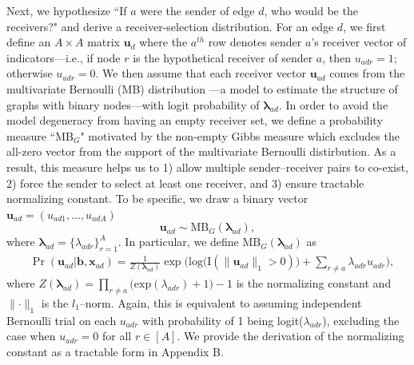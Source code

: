 \documentclass[ba]{imsart}
\numberwithin{equation}{section}
\theoremstyle{plain}
\begin{document}
Next, we hypothesize ``If $a$ were the sender of edge $d$, who would be the receivers?" and derive a receiver-selection distribution. For an edge $d$, we first define an $A\times A$ matrix $\boldsymbol{u}_d$ where the $a^{th}$ row denotes sender $a$'s receiver vector of indicators---i.e., if node $r$ is the hypothetical receiver of sender $a$, then $u_{adr}=1$; otherwise $u_{adr}=0$. We then assume that each receiver vector $\boldsymbol{u}_{ad}$ comes from the multivariate Bernoulli (MB) distribution \citep{dai2013multivariate}---a model to estimate the structure of graphs with binary nodes---with logit probability of $\boldsymbol{\lambda}_{ad}$. In order to avoid the model degeneracy from having an empty receiver set, we define a probability measure ``MB$_{G}$" motivated by the non-empty Gibbs measure \citep{fellows2017removing} which excludes the all-zero vector from the support of the multivariate Bernoulli distirbution. As a result, this measure helps us to 1) allow multiple sender--receiver pairs to co-exist, 2) force the sender to select at least one receiver, and 3) ensure tractable normalizing constant. To be specific, we draw a binary vector $\boldsymbol{u}_{ad}= (u_{ad1},
\ldots, u_{adA})$ 
\begin{equation} \boldsymbol{u}_{ad}  \sim
\mbox{MB}_{G}(\boldsymbol{\lambda}_{ad}),
\end{equation}
where $\boldsymbol{\lambda}_{ad}= \{\lambda_{adr}\}_{r=1}^A$. In particular, we define $\mbox{MB}_{G}(\boldsymbol{\lambda}_{ad})$ as
\begin{equation}
\begin{aligned}
&\Pr(\boldsymbol{u}_{ad}|\boldsymbol{b}, \boldsymbol{x}_{ad}) = \frac{1}{Z(\boldsymbol{\lambda}_{ad})}\exp\Big(\mbox{log}\big(\text{I}( \lVert \boldsymbol{u}_{ad}\rVert_1 > 0 )\big) + \sum_{r\neq a} \lambda_{adr}u_{adr}\Big) ,
\end{aligned}
\label{eqn:Gibbs}
\end{equation}
where $Z(\boldsymbol{\lambda}_{ad})= \prod_{r \neq a} \big(\mbox{exp}(\lambda_{adr}) + 1\big)-1$ is the normalizing constant and $\lVert \cdot \rVert_1$ is the $l_1$--norm. Again, this is equivalent to assuming independent Bernoulli trial on each $u_{adr}$ with probability of 1 being logit($\lambda_{adr}$), excluding the case when $u_{adr}=0$ for all $r \in [A]$. We provide the derivation of the normalizing constant as a tractable form in Appendix B. 
\end{document}
